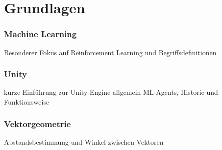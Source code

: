 \chapter{Grundlagen}
\subsection{Machine Learning}
Besonderer Fokus auf Reinforcement Learning und Begriffsdefinitionen

\subsection{Unity}
kurze Einführung zur Unity-Engine allgemein
ML-Agents, Historie und Funktionsweise

\subsection{Vektorgeometrie}
Abstandsbestimmung und Winkel zwischen Vektoren